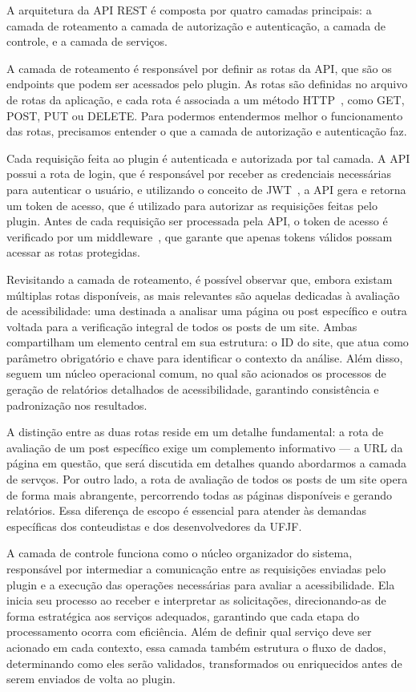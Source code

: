 \documentclass[12pt]{article}
\begin{document}
A arquitetura da API REST é composta por quatro camadas principais: a camada
de roteamento a camada de autorização e autenticação, a camada de controle,
e a camada de serviços.

A camada de roteamento é responsável por definir as rotas da API, que
são os endpoints que podem ser acessados pelo plugin. As rotas são definidas
no arquivo de rotas da aplicação, e cada rota é associada a um método
HTTP~\autocite{HTTP}, como GET, POST, PUT ou DELETE. Para
podermos entendermos melhor o funcionamento das rotas, precisamos entender
o que a camada de autorização e autenticação faz.

Cada requisição feita ao plugin é autenticada e autorizada por tal camada.
A API possui a rota de login, que é responsável por receber as credenciais
necessárias para autenticar o usuário, e utilizando o conceito de JWT~\autocite{JWT},
a API gera e retorna um token de acesso, que é utilizado para autorizar as
requisições feitas pelo plugin. Antes de cada requisição ser processada pela
API, o token de acesso é verificado por um middleware~\autocite{mw},
que garante que apenas tokens válidos possam acessar as rotas protegidas.

Revisitando a camada de roteamento, é possível observar que, embora
existam múltiplas rotas disponíveis, as mais relevantes são aquelas dedicadas
à avaliação de acessibilidade: uma destinada a analisar uma página ou post
específico e outra voltada para a verificação integral de todos os posts de um
site. Ambas compartilham um elemento central em sua estrutura: o ID do
site, que atua como parâmetro obrigatório e chave para identificar o contexto
da análise. Além disso, seguem um núcleo operacional comum, no qual são
acionados os processos de geração de relatórios detalhados de acessibilidade,
garantindo consistência e padronização nos resultados.

A distinção entre as duas rotas reside em um detalhe fundamental: a rota
de avaliação de um post específico exige um complemento informativo — a
URL da página em questão, que será discutida em detalhes quando abordarmos
a camada de servços. Por outro lado, a rota de avaliação de todos os posts
de um site opera de forma mais abrangente, percorrendo todas as páginas
disponíveis e gerando relatórios. Essa diferença de escopo é essencial para
atender às demandas específicas dos conteudistas e dos desenvolvedores da UFJF\@.

A camada de controle funciona como o núcleo organizador do sistema,
responsável por intermediar a comunicação entre as requisições enviadas pelo
plugin e a execução das operações necessárias para avaliar a acessibilidade.
Ela inicia seu processo ao receber e interpretar as solicitações, direcionando-as
de forma estratégica aos serviços adequados, garantindo que cada etapa do
processamento ocorra com eficiência. Além de definir qual serviço deve ser
acionado em cada contexto, essa camada também estrutura o fluxo de dados,
determinando como eles serão validados, transformados ou enriquecidos antes
de serem enviados de volta ao plugin.


\nocite{*}
\printbibliography[title={Referências}]
\end{document}
